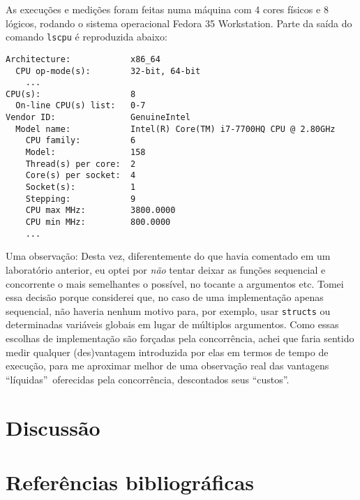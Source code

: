 \documentclass{article}
\begin{document}
  As execuções e medições foram feitas numa máquina com 4 cores físicos e 8 lógicos, rodando o sistema operacional Fedora 35 Workstation. Parte da saída do comando \texttt{lscpu} é reproduzida abaixo:

\begin{lstlisting}
Architecture:            x86_64
  CPU op-mode(s):        32-bit, 64-bit
    ...
CPU(s):                  8
  On-line CPU(s) list:   0-7
Vendor ID:               GenuineIntel
  Model name:            Intel(R) Core(TM) i7-7700HQ CPU @ 2.80GHz
    CPU family:          6
    Model:               158
    Thread(s) per core:  2
    Core(s) per socket:  4
    Socket(s):           1
    Stepping:            9
    CPU max MHz:         3800.0000
    CPU min MHz:         800.0000
    ...
\end{lstlisting}

  Uma observação: Desta vez, diferentemente do que havia comentado em um laboratório anterior, eu optei por \emph{não} tentar deixar as funções sequencial e concorrente o mais semelhantes o possível, no tocante a argumentos etc. Tomei essa decisão porque considerei que, no caso de uma implementação apenas sequencial, não haveria nenhum motivo para, por exemplo, usar \texttt{structs} ou determinadas variáveis globais em lugar de múltiplos argumentos. Como essas escolhas de implementação são forçadas pela concorrência, achei 
  que faria sentido medir qualquer (des)vantagem introduzida por elas 
  em termos de tempo de execução, para me aproximar melhor de uma 
  observação real das vantagens ``líquidas''\ oferecidas pela concorrência, descontados seus ``custos''.

  \section{Discussão} \label{disc}

  \section{Referências bibliográficas} \label{bibl}

  \printbibliography
\end{document}
